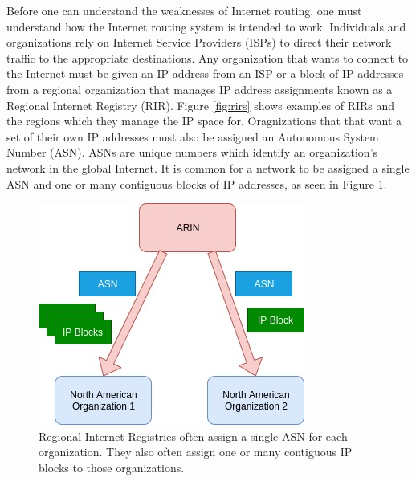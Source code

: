 \documentclass[conference]{IEEEtran}
\begin{document}
Before one can understand the weaknesses of Internet routing, one must understand how the Internet routing system is intended to work.  Individuals and organizations rely on Internet Service Providers (ISPs) to direct their network traffic to the appropriate destinations.  Any organization that wants to connect to the Internet must be given an IP address from an ISP or a block of IP addresses from a regional organization that manages IP address assignments known as a Regional Internet Registry (RIR).  Figure \ref{fig:rirs} shows examples of RIRs and the regions which they manage the IP space for.  Oragnizations that that want a set of their own IP addresses must also be assigned an Autonomous System Number (ASN).  ASNs are unique numbers which identify an organization's network in the global Internet.  It is common for a network to be assigned a single ASN and one or many contiguous blocks of IP addresses, as seen in Figure \ref{fig:rir-assignments}.

\begin{figure}
  \includegraphics[width=\linewidth]{images/rir-assignments.jpg}
  \caption{Regional Internet Registries often assign a single ASN for each organization.  They also often assign one or many contiguous IP blocks to those organizations.}
  \label{fig:rir-assignments}
\end{figure}
\end{document}
